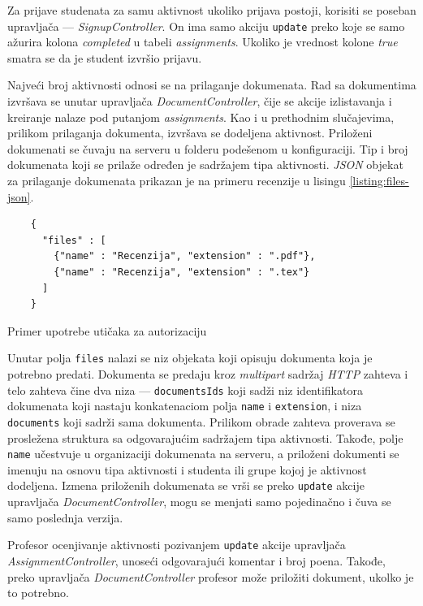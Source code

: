\documentclass[12pt,oneside]{memoir}
\begin{document}
Za prijave studenata za samu aktivnost ukoliko prijava postoji, korisiti se poseban upravljača --- \emph{SignupController}.
On ima samo akciju \texttt{update} preko koje se samo ažurira kolona \emph{completed} u tabeli \emph{assignments}.
Ukoliko je vrednost kolone \emph{true} smatra se da je student izvršio prijavu.

Najveći broj aktivnosti odnosi se na prilaganje dokumenata. Rad sa dokumentima izvršava se unutar upravljača \emph{DocumentController},
čije se akcije izlistavanja i kreiranje nalaze pod putanjom \emph{assignments}. Kao i u prethodnim slučajevima, prilikom prilaganja dokumenta,
izvršava se dodeljena aktivnost. Priloženi dokumenati se čuvaju na serveru u folderu podešenom u konfiguraciji.
Tip i broj dokumenata koji se prilaže određen je sadržajem tipa aktivnosti. \emph{JSON} objekat za prilaganje dokumenata prikazan je
na primeru recenzije u lisingu \ref{listing:files-json}. 
\begin{listing}[h!]
\begin{verbatim}
    {
      "files" : [
        {"name" : "Recenzija", "extension" : ".pdf"},
        {"name" : "Recenzija", "extension" : ".tex"}
      ]
    }
\end{verbatim}
\caption{Primer upotrebe utičaka za autorizaciju}
\label{listing:files-json}
\end{listing}
Unutar polja \texttt{files} nalazi se niz objekata koji opisuju dokumenta koja je potrebno predati.
Dokumenta se predaju kroz \emph{multipart} sadržaj \emph{HTTP} zahteva i telo zahteva čine dva niza ---
\texttt{documentsIds} koji sadži niz identifikatora dokumenata koji nastaju konkatenaciom polja
\texttt{name} i \texttt{extension}, i niza \texttt{documents} koji sadrži sama dokumenta.
Prilikom obrade zahteva proverava se prosležena struktura sa odgovarajućim sadržajem tipa aktivnosti.
Takođe, polje \texttt{name} učestvuje u organizaciji dokumenata na serveru, a priloženi dokumenti se
imenuju na osnovu tipa aktivnosti i studenta ili grupe kojoj je aktivnost dodeljena.
Izmena priloženih dokumenata se vrši se preko \texttt{update} akcije upravljača \emph{DocumentController},
mogu se menjati samo pojedinačno i čuva se samo poslednja verzija.

Profesor ocenjivanje aktivnosti pozivanjem \texttt{update} akcije upravljača \emph{AssignmentController},
unoseći odgovarajući komentar i broj poena. Takođe, preko upravljača \emph{DocumentController} profesor može
priložiti dokument, ukolko je to potrebno.  
\end{document}
